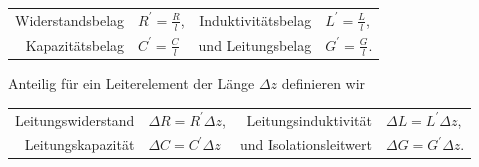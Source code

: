 \documentclass[paper=a4, parskip=half-, ngerman, fontsize=11pt]{scrreprt}
\begin{document}
\begin{tabular}{r l r l}
    Widerstandsbelag & $R^{\prime} = \frac{R}{l}$, & Induktivitätsbelag & $L^{\prime} = \frac{L}{l}$, \\
\addlinespace
    Kapazitätsbelag & $C^{\prime} = \frac{C}{l}$ & und Leitungsbelag & $G^{\prime} = \frac{G}{l}$. \\
\end{tabular}

Anteilig für ein Leiterelement der Länge $\Delta z$ definieren wir

\begin{tabular}{r l r l}
    Leitungswiderstand & $\Delta R = R^{\prime} \Delta z$, &
    Leitungsinduktivität & $\Delta L = L^{\prime} \Delta z$, \\
\addlinespace
    Leitungskapazität & $\Delta C = C^{\prime} \Delta z$ &
    und Isolationsleitwert & $\Delta G = G^{\prime} \Delta z$. \\
\end{tabular}
\end{document}
